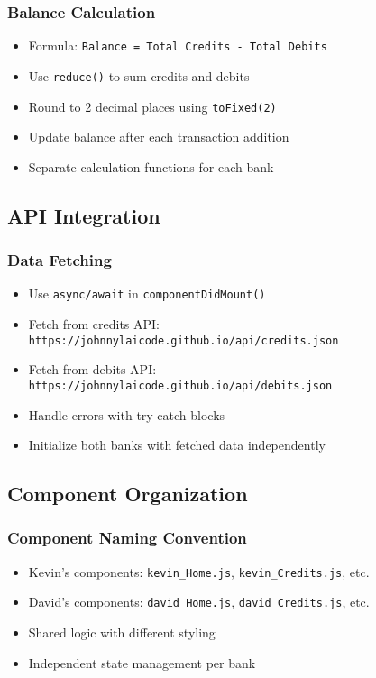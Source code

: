\documentclass[11pt,a4paper]{article}
\begin{document}
\subsubsection{Balance Calculation}
\begin{itemize}[leftmargin=*]
    \item Formula: \texttt{Balance = Total Credits - Total Debits}
    \item Use \texttt{reduce()} to sum credits and debits
    \item Round to 2 decimal places using \texttt{toFixed(2)}
    \item Update balance after each transaction addition
    \item Separate calculation functions for each bank
\end{itemize}

\subsection{API Integration}

\subsubsection{Data Fetching}
\begin{itemize}[leftmargin=*]
    \item Use \texttt{async/await} in \texttt{componentDidMount()}
    \item Fetch from credits API: \texttt{https://johnnylaicode.github.io/api/credits.json}
    \item Fetch from debits API: \texttt{https://johnnylaicode.github.io/api/debits.json}
    \item Handle errors with try-catch blocks
    \item Initialize both banks with fetched data independently
\end{itemize}

\subsection{Component Organization}

\subsubsection{Component Naming Convention}
\begin{itemize}[leftmargin=*]
    \item Kevin's components: \texttt{kevin\_Home.js}, \texttt{kevin\_Credits.js}, etc.
    \item David's components: \texttt{david\_Home.js}, \texttt{david\_Credits.js}, etc.
    \item Shared logic with different styling
    \item Independent state management per bank
\end{itemize}
\end{document}
